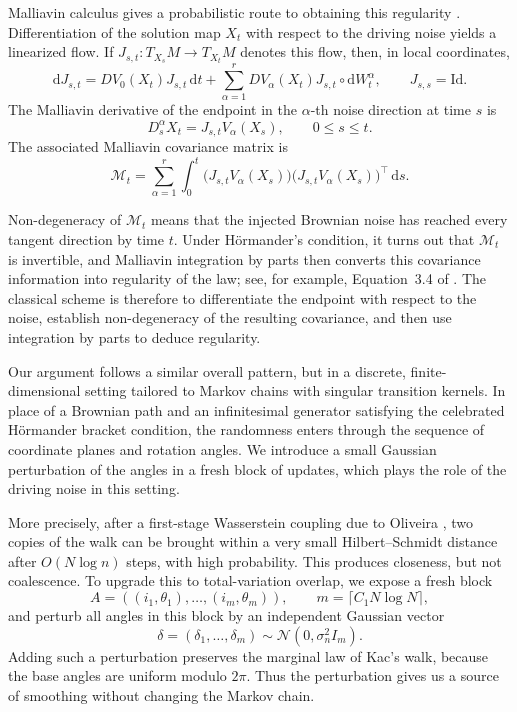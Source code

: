 \documentclass[11pt, reqno]{amsart}
\numberwithin{equation}{section}
\theoremstyle{remark}
\newcommand{\1}{\mathbf{1}}
\newcommand{\Id}{\mathrm{Id}}
\newcommand{\dd}{\mathrm{d}}
\begin{document}
Malliavin calculus gives a probabilistic route to obtaining this regularity
\cite{Malliavin1978,Nualart2006,Hairer2011Hormander,KusuokaStroock1984,KusuokaStroock1985,Norris1986}.
Differentiation of the solution map $X_t$ with respect to the driving noise yields a
linearized flow. If \(J_{s,t}:T_{X_s}M\to T_{X_t}M\) denotes this flow, then, in
local coordinates,
\[
    \dd J_{s,t}
    =
    DV_0(X_t)J_{s,t}\,\dd t
    +
    \sum_{\alpha=1}^r DV_\alpha(X_t)J_{s,t}\circ \dd W_t^\alpha,
    \qquad
    J_{s,s}=\Id .
\]
The Malliavin derivative of the endpoint in the \(\alpha\)-th noise direction at
time \(s\) is
\[
    D_s^\alpha X_t
    =
    J_{s,t}V_\alpha(X_s),
    \qquad 0\le s\le t.
\]
The associated Malliavin covariance matrix is
\begin{equation}
\label{eq:classical-malliavin-covariance}
    \mathcal M_t
    =
    \sum_{\alpha=1}^r
    \int_0^t
    \bigl(J_{s,t}V_\alpha(X_s)\bigr)
    \bigl(J_{s,t}V_\alpha(X_s)\bigr)^\top
    \,\dd s .
\end{equation}

Non-degeneracy of \(\mathcal M_t\) means that the injected Brownian noise has
reached every tangent direction by time \(t\). Under Hörmander's condition, it turns 
out that \(\mathcal M_t\) is invertible, and Malliavin integration by parts
then converts this covariance information into regularity of the law; see, for
example, Equation~3.4 of \cite{Hairer2011Hormander}. The classical scheme is
therefore to differentiate the endpoint with respect to the noise, establish
non-degeneracy of the resulting covariance, and then use integration by parts to
deduce regularity.

Our argument follows a similar overall pattern, but in a discrete, finite-dimensional setting tailored to Markov chains with singular transition kernels. In place of a Brownian path and an infinitesimal generator satisfying the celebrated Hörmander bracket condition, the randomness enters through the sequence of coordinate planes and rotation angles. We introduce a small Gaussian perturbation of the angles in a fresh block of updates, which plays the role of the driving noise in this setting.

More precisely, after a first-stage Wasserstein coupling due to Oliveira
\cite{Oliveira}, two copies of the walk can be brought within a very small
Hilbert--Schmidt distance after \(O(N\log n)\) steps, with high probability.
This produces closeness, but not coalescence.  To upgrade this to total-variation
overlap, we expose a fresh block
\[
    A=((i_1,\theta_1),\ldots,(i_m,\theta_m)),
    \qquad
    m=\lceil C_1N\log N\rceil,
\]
and perturb all angles in this block by an independent Gaussian vector
\[
    \delta=(\delta_1,\ldots,\delta_m)\sim \mathcal N(0,\sigma_n^2 I_m).
\]
Adding such a perturbation preserves the marginal law of Kac's walk, because the
base angles are uniform modulo \(2\pi\).  Thus the perturbation gives us a source
of smoothing without changing the Markov chain.
\end{document}
